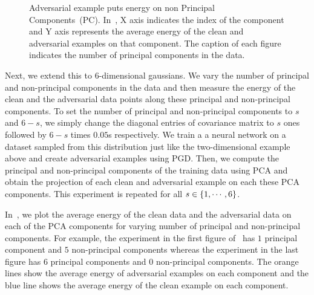 \begin{figure}[t]
  \caption{Adversarial example puts energy on non Principal Components~(PC).
  In~, X axis indicates the index of the component and Y
  axis represents the average energy of the {\color{blue} clean} and
  {\color{orange} adversarial} examples on that component. The caption of each
  figure indicates the number of principal components in the data.
  }
  \label{fig:6-dim-gauss}
\end{figure}

Next, we extend this to \(6\)-dimensional gaussians. We vary the number of
principal and non-principal components in the data and then measure the energy
of the clean and the adversarial data points along these principal and
non-principal components. To set the number of principal and non-principal
components to \(s\) and \(6-s\), we simply change the diagonal entries of
covariance matrix to \(s\) ones followed by \(6-s\) times \(0.05\)s
respectively. We train a a neural network on a dataset sampled from this
distribution just like the two-dimensional example above and create adversarial
examples using PGD. Then, we compute the principal and non-principal components
of the training data using PCA and obtain the projection of each clean and
adversarial example on each these PCA components. This experiment is repeated
for all \(s\in\left\{{1,\cdots,6}\right\}\).

In~, we plot the average energy of the clean data and the
adversarial data on each of the PCA components for varying number of principal
and non-principal components. For example, the experiment in  the first figure
of~ has \(1\) principal component and \(5\) non-principal
components whereas the experiment in the last figure has \(6\) principal
components and \(0\) non-principal components. The {\color{orange} orange} lines
show the average energy of adversarial examples on each component and the
{\color{blue} blue} line shows the average energy of the clean example on each
component.

